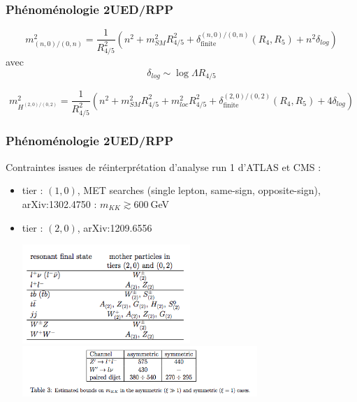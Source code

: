 \begin{frame}[plain]
\frametitle{Phénoménologie 2UED/RPP}
\[m_{(n,0)/(0,n)}^2=\frac{1}{R_{4/5}^2}\left(n^2+m_{SM}^2R_{4/5}^2+\delta_\text{finite}^{(n,0)/(0,n)}\left(R_4,R_5\right)+n^2\delta_{log}\right)\]
avec 
\[\delta_{log}\sim \log\Lambda R_{4/5}\]

\[m_{H^{(2,0)/(0,2)}}^2=\frac{1}{R_{4/5}^2}\left(n^2+m_{SM}^2R_{4/5}^2+m_{loc}^2R_{4/5}^2+\delta_\text{finite}^{(2,0)/(0,2)}\left(R_4,R_5\right)+4\delta_{log}\right)\]
\end{frame}

\begin{frame}[plain]
\frametitle{Phénoménologie 2UED/RPP}
\begin{maliste}
\item Contraintes issues de réinterprétation d'analyse run 1 d'ATLAS et CMS :
\begin{itemize}
\item tier : $(1,0)$, MET searches (single lepton, same-sign, opposite-sign), arXiv:1302.4750 : $m_{KK}\gtrsim 600~$GeV  
\item tier : $(2,0)$, arXiv:1209.6556
\begin{center}
\includegraphics[width=0.5\textwidth]{Figures/FourTops/reinterpretation2UEDRPPtier20.png}\\
\includegraphics[width=0.7\textwidth]{Figures/FourTops/reinterpretation2UEDRPPtier20_resultats.png}
\end{center}
\end{itemize}
\end{maliste}
\end{frame}


